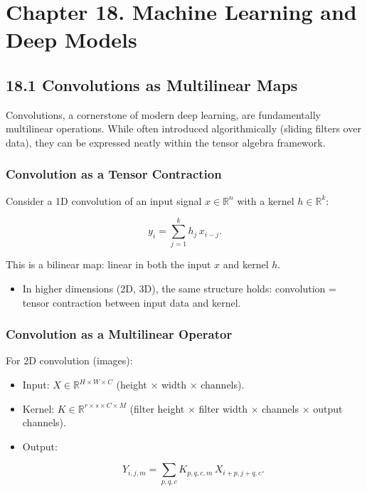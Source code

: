 \documentclass[
  letterpaper,
  DIV=11,
  numbers=noendperiod]{scrreprt}
\providecommand{\tightlist}{%
  \setlength{\itemsep}{0pt}\setlength{\parskip}{0pt}}
\begin{document}
\section{Chapter 18. Machine Learning and Deep
Models}\label{chapter-18.-machine-learning-and-deep-models}

\subsection{18.1 Convolutions as Multilinear
Maps}\label{convolutions-as-multilinear-maps}

Convolutions, a cornerstone of modern deep learning, are fundamentally
multilinear operations. While often introduced algorithmically (sliding
filters over data), they can be expressed neatly within the tensor
algebra framework.

\subsubsection{Convolution as a Tensor
Contraction}\label{convolution-as-a-tensor-contraction}

Consider a 1D convolution of an input signal \(x \in \mathbb{R}^n\) with
a kernel \(h \in \mathbb{R}^k\):

\[
y_i = \sum_{j=1}^k h_j \, x_{i-j}.
\]

This is a bilinear map: linear in both the input \(x\) and kernel \(h\).

\begin{itemize}
\tightlist
\item
  In higher dimensions (2D, 3D), the same structure holds: convolution =
  tensor contraction between input data and kernel.
\end{itemize}

\subsubsection{Convolution as a Multilinear
Operator}\label{convolution-as-a-multilinear-operator}

For 2D convolution (images):

\begin{itemize}
\item
  Input: \(X \in \mathbb{R}^{H \times W \times C}\) (height × width ×
  channels).
\item
  Kernel: \(K \in \mathbb{R}^{r \times s \times C \times M}\) (filter
  height × filter width × channels × output channels).
\item
  Output:

  \[
  Y_{i,j,m} = \sum_{p,q,c} K_{p,q,c,m} \, X_{i+p, j+q, c}.
  \]
\end{itemize}
\end{document}
